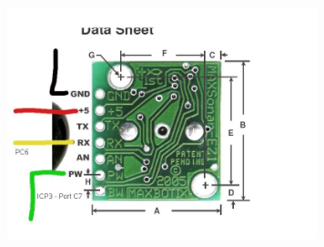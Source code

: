 \begin{minipage}{6.5in}
  \centering
    \includegraphics[width=90mm]{imageSources/sonarConnect.png}
 
  \label{sonarConnect}
\end{minipage}
